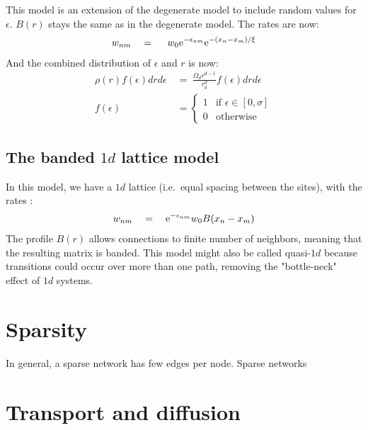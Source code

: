 This model is an extension of the degenerate model to include
random values for $\epsilon$. $B(r)$ stays the same as in the degenerate model.
The rates are now:
%
\begin{align}\label{eq:mott_hopping_rates}
w_{nm} \quad = \quad \ w_0 \mbox{e}^{-\epsilon_{nm}}\mbox{e}^{-(x_n-x_m)/\xi}
\end{align}
%
And the combined distribution of $\epsilon$ and $r$ is now:
%
\begin{align}\label{eq:mott_distribution}
\rho(r)f(\epsilon)drd\epsilon \ &=\ \frac{\Omega_d r^{d-1}}{r_0^d} f(\epsilon) dr d\epsilon \\
f(\epsilon)\ &= 
  \begin{cases} 
    1 &\textrm{if   } \epsilon \in [0,\sigma] \\
    0 &\textrm{otherwise}
  \end{cases}
\end{align}
%


\subsection{The banded $1d$ lattice model}

In this model, we have a $1d$ lattice (i.e.\ equal spacing between the sites), 
with the rates :
%
\begin{align}
w_{nm} \quad = \quad \mbox{e}^{-\epsilon_{nm}}w_0 B(x_n-x_m)
\end{align}
%
The profile $B(r)$ allows connections to finite number of neighbors,
meaning that the resulting matrix is banded. This model might also
be called quasi-$1d$ because transitions could occur over more
than one path, removing the "bottle-neck" effect of $1d$ systems.


\section{Sparsity}

In general, a sparse network has few edges per node. Sparse networks 

\cite{cohen_energy_2012}

\section{Transport and diffusion}




